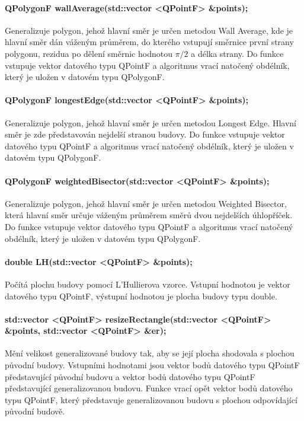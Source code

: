 \documentclass[11pt]{article}
\begin{document}
 	\paragraph{QPolygonF wallAverage(std::vector <QPointF> \&points);}
 	Generalizuje polygon, jehož hlavní směr je určen metodou Wall Average, kde je hlavní směr dán váženým průměrem, do kterého vstupují směrnice první strany polygonu, rezidua po dělení směrnic hodnotou $\pi/2$ a délka strany. Do funkce vstupuje vektor datového typu QPointF a algoritmus vrací natočený obdélník, který je uložen v datovém typu QPolygonF.
 	
 	\paragraph{QPolygonF longestEdge(std::vector <QPointF> \&points);}
 	Generalizuje polygon, jehož hlavní směr je určen metodou Longest Edge. Hlavní směr je zde představován nejdelší stranou budovy. Do funkce vstupuje vektor datového typu QPointF a algoritmus vrací natočený obdélník, který je uložen v datovém typu QPolygonF.
 	
 	\paragraph{QPolygonF weightedBisector(std::vector <QPointF> \&points);}
 	Generalizuje polygon, jehož hlavní směr je určen metodou Weighted Bisector, která hlavní směr určuje váženým průměrem směrů dvou nejdelších úhlopříček. Do funkce vstupuje vektor datového typu QPointF a algoritmus vrací natočený obdélník, který je uložen v datovém typu QPolygonF.
 	
 	\paragraph{double LH(std::vector <QPointF> \&points);}
 	Počítá plochu budovy pomocí L'Hullierova vzorce. Vstupní hodnotou je vektor datového typu QPoi\-ntF, výstupní hodnotou je plocha budovy typu double.
 	
 	\paragraph{std::vector <QPointF> resizeRectangle(std::vector <QPointF> \&points, \newline std::vector <QPointF> \&er);}
 	Mění velikost generalizované budovy tak, aby se její plocha shodovala s plochou původní budovy. Vstupními hodnotami jsou vektor bodů datového typu QPointF představující původní budovu a vektor bodů datového typu QPointF představující generalizovanou budovu. Funkce vrací opět vektor bodů datového typu QPointF, který představuje generalizovanou budovu s plochou odpovídající původní budově.
	 	
\end{document}
